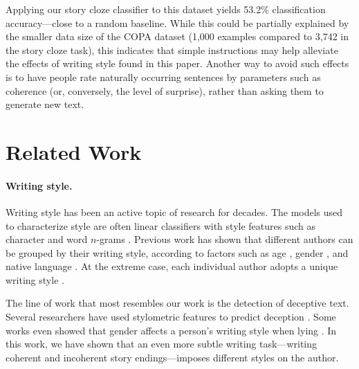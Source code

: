 \documentclass[11pt,a4paper]{article}
\newcommand{\isection}[2]{\section{#1}\label{ssec:#2}}
\begin{document}
Applying our story cloze classifier to this dataset yields 53.2\%
classification accuracy---close to a random baseline. 
While this could be partially explained by the smaller data size of the COPA dataset (1,000 examples compared to 3,742 in the story cloze task), this indicates that simple instructions may help alleviate the effects of writing style found in this paper.
Another way to avoid such effects is to have people rate naturally occurring sentences  by parameters
such as coherence (or, conversely, the level of surprise),
rather than asking them to generate new text.



\isection{Related Work}{Related}

\paragraph{Writing style.}
Writing style has been an active topic of research for decades. 
The models used to characterize style are often linear classifiers with style features such as character and word $n$-grams \cite{Stamatatos:2009,Koppel:2009}.
Previous work has shown that different authors can be grouped by their
writing style, according to factors such as age
\cite{Pennebaker:2003,Argamon:2003,Schler:2006,Rosenthal:2011,nguyen:2011:latech},
gender \cite{Argamon:2003,Schler:2006,bamman2014gender}, and native language
\cite{Koppel:2005,Tsur:2007,Bergsma:2012}.
At the extreme case, each individual author adopts a unique writing
style \cite{mosteller1963inference,pennebaker1999linguistic,Schwartz:2013}. 

The line of work that most resembles our work is the detection of deceptive text. 
Several researchers have used stylometric features to  predict deception 
\cite{Newman:2003,hancock2007lying,ott2011finding,Feng:2012}.
Some works even showed that gender affects a person's  writing style when lying \cite{Perez:2014b,Perez:2014a}.
In this work, we have shown that an even more subtle writing task---writing {coherent} and {incoherent} story endings---imposes different styles on the author.
\end{document}

